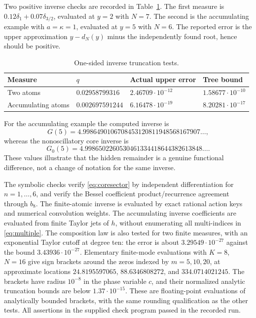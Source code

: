 \documentclass[11pt,a4paper]{article}
\theoremstyle{definition}
\theoremstyle{remark}
\numberwithin{equation}{section}
\begin{document}
Two positive inverse checks are recorded in Table~\ref{tab:inversechecks}. The first measure is $0.12\delta_1+0.07\delta_{3/2}$, evaluated at $y=2$ with $N=7$. The second is the accumulating example with $a=\kappa=1$, evaluated at $y=5$ with $N=6$. The reported error is the upper approximation $y-d_N(y)$ minus the independently found root, hence should be positive.

\begin{table}[ht]
\centering\small
\caption{One-sided inverse truncation tests.}\label{tab:inversechecks}
\begin{tabular}{@{}llll@{}}
\toprule
Measure & $q$ & Actual upper error & Tree bound\\
\midrule
Two atoms & $0.02958799316$ & $2.46709\cdot10^{-12}$ & $1.58677\cdot10^{-10}$\\
Accumulating atoms & $0.002697591244$ & $6.16478\cdot10^{-19}$ & $8.20281\cdot10^{-17}$\\
\bottomrule
\end{tabular}
\end{table}

For the accumulating example the computed inverse is
\[
 G(5)=4.9986490106708453120811948568167907\ldots,
\]
whereas the nonoscillatory core inverse is
\[
 G_0(5)=4.9986502260530461334418644382613848\ldots.
\]
These values illustrate that the hidden remainder is a genuine functional difference, not a change of notation for the same inverse.

The symbolic checks verify \eqref{eq:coresector} by independent differentiation for $n=1,\ldots,6$, and verify the Bessel coefficient product/recurrence agreement through $b_8$. The finite-atomic inverse is evaluated by exact rational action keys and numerical convolution weights. The accumulating inverse coefficients are evaluated from finite Taylor jets of $h$, without enumerating all multi-indices in \eqref{eq:multiple}. The composition law is also tested for two finite measures, with an exponential Taylor cutoff at degree ten: the error is about $3.29549\cdot10^{-27}$ against the bound $3.43936\cdot10^{-27}$. Elementary finite-mode evaluations with $K=8$, $N=16$ give sign brackets around the zeros indexed by $m=5,10,20$, at approximate locations $24.8195597065$, $88.6346808272$, and $334.0714021245$. The brackets have radius $10^{-8}$ in the phase variable $c$, and their normalized analytic truncation bounds are below $1.37\cdot10^{-15}$. These are floating-point evaluations of analytically bounded brackets, with the same rounding qualification as the other tests. All assertions in the supplied check program passed in the recorded run.
\end{document}
